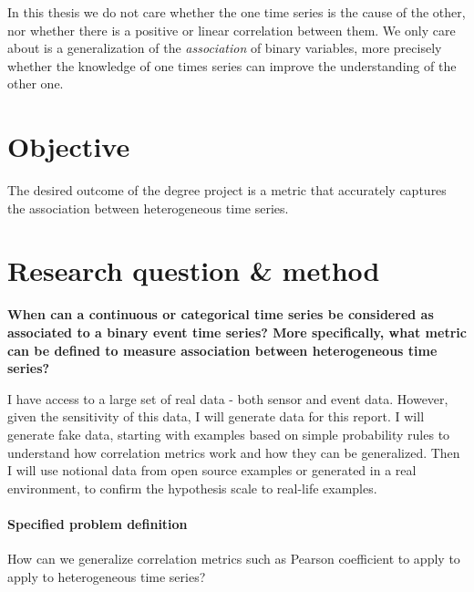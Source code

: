 \documentclass[12pt,a4paper]{article}
\begin{document}
In this thesis we do not care whether the one time series is the cause of the other, nor whether there is a positive or linear correlation between them. We only care about is a generalization of the \emph{association} of binary variables, more precisely whether the knowledge of one times series can improve the understanding of the other one.

\clearpage

\section*{Objective}

The desired outcome of the degree project is a metric that accurately captures the association between heterogeneous time series.


\section*{Research question \& method}

\textbf{When can a continuous or categorical time series be considered as associated to a binary event time series? More specifically, what metric can be defined to measure association between heterogeneous time series?}

\medskip

I have access to a large set of real data - both sensor and event data. However, given the sensitivity of this data, I will generate data for this report.
I will generate fake data, starting with examples based on simple probability rules to understand how correlation metrics work and how they can be generalized. Then I will use notional data from open source examples or generated in a real environment, to confirm the hypothesis scale to real-life examples.


\paragraph*{Specified problem definition}

How can we generalize correlation metrics such as Pearson coefficient to apply to apply to heterogeneous time series?

\end{document}

